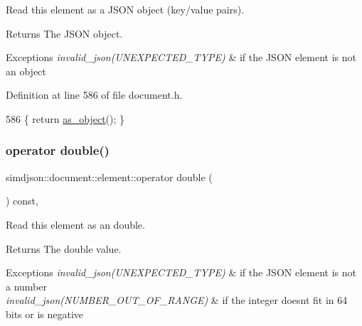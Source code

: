 Read this element as a J\+S\+ON object (key/value pairs). 

\begin{DoxyReturn}{Returns}
The J\+S\+ON object. 
\end{DoxyReturn}

\begin{DoxyExceptions}{Exceptions}
{\em invalid\+\_\+json(\+U\+N\+E\+X\+P\+E\+C\+T\+E\+D\+\_\+\+T\+Y\+P\+E)} & if the J\+S\+ON element is not an object \\
\hline
\end{DoxyExceptions}


Definition at line 586 of file document.\+h.


\begin{DoxyCode}
586 \{ \textcolor{keywordflow}{return} \hyperlink{classsimdjson_1_1document_1_1element_a1fe44151506bca67f318f9f4aeb02fc6}{as\_object}(); \}
\end{DoxyCode}
\mbox{\label{classsimdjson_1_1document_1_1element_a063b979cbc6960b4370d074b76455e7a}} 
\subsubsection{\texorpdfstring{operator double()}{operator double()}}
{\footnotesize\ttfamily simdjson\+::document\+::element\+::operator double (\begin{DoxyParamCaption}{ }\end{DoxyParamCaption}) const\hspace{0.3cm}{\ttfamily [inline]}, {\ttfamily [noexcept]}}



Read this element as an double. 

\begin{DoxyReturn}{Returns}
The double value. 
\end{DoxyReturn}

\begin{DoxyExceptions}{Exceptions}
{\em invalid\+\_\+json(\+U\+N\+E\+X\+P\+E\+C\+T\+E\+D\+\_\+\+T\+Y\+P\+E)} & if the J\+S\+ON element is not a number \\
\hline
{\em invalid\+\_\+json(\+N\+U\+M\+B\+E\+R\+\_\+\+O\+U\+T\+\_\+\+O\+F\+\_\+\+R\+A\+N\+G\+E)} & if the integer doesn\textquotesingle{}t fit in 64 bits or is negative \\
\hline
\end{DoxyExceptions}


